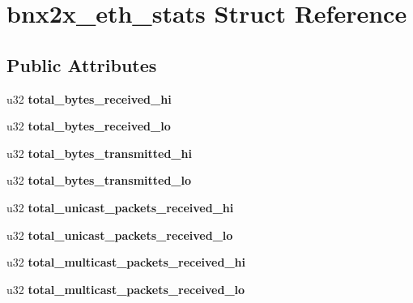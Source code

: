\hypertarget{structbnx2x__eth__stats}{
\section{bnx2x\_\-eth\_\-stats Struct Reference}
\label{structbnx2x__eth__stats}
}
\subsection*{Public Attributes}
\begin{DoxyCompactItemize}
\item 
\hypertarget{structbnx2x__eth__stats_aea653e30938811a95bf2e7a5033a5c82}{
u32 {\bfseries total\_\-bytes\_\-received\_\-hi}}
\label{structbnx2x__eth__stats_aea653e30938811a95bf2e7a5033a5c82}

\item 
\hypertarget{structbnx2x__eth__stats_a09875deeb3a885e9531c3742c5e4c8a8}{
u32 {\bfseries total\_\-bytes\_\-received\_\-lo}}
\label{structbnx2x__eth__stats_a09875deeb3a885e9531c3742c5e4c8a8}

\item 
\hypertarget{structbnx2x__eth__stats_a570097a2e28cda546e3816bf3a73d893}{
u32 {\bfseries total\_\-bytes\_\-transmitted\_\-hi}}
\label{structbnx2x__eth__stats_a570097a2e28cda546e3816bf3a73d893}

\item 
\hypertarget{structbnx2x__eth__stats_a21fb89a12758832f10cfa39c756e25a2}{
u32 {\bfseries total\_\-bytes\_\-transmitted\_\-lo}}
\label{structbnx2x__eth__stats_a21fb89a12758832f10cfa39c756e25a2}

\item 
\hypertarget{structbnx2x__eth__stats_aef63583e95b7cab11c70db2667244c37}{
u32 {\bfseries total\_\-unicast\_\-packets\_\-received\_\-hi}}
\label{structbnx2x__eth__stats_aef63583e95b7cab11c70db2667244c37}

\item 
\hypertarget{structbnx2x__eth__stats_a07cc9a89f1d5a71db90ee813738862a2}{
u32 {\bfseries total\_\-unicast\_\-packets\_\-received\_\-lo}}
\label{structbnx2x__eth__stats_a07cc9a89f1d5a71db90ee813738862a2}

\item 
\hypertarget{structbnx2x__eth__stats_a54544729d3c65bf3fdaf27e8f833e47b}{
u32 {\bfseries total\_\-multicast\_\-packets\_\-received\_\-hi}}
\label{structbnx2x__eth__stats_a54544729d3c65bf3fdaf27e8f833e47b}

\item 
\hypertarget{structbnx2x__eth__stats_a15e69842bfa85eeddeb0d65e6ac34fe5}{
u32 {\bfseries total\_\-multicast\_\-packets\_\-received\_\-lo}}
\label{structbnx2x__eth__stats_a15e69842bfa85eeddeb0d65e6ac34fe5}


\end{DoxyCompactItemize}
